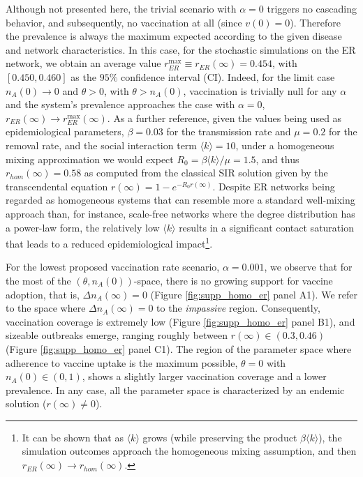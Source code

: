 \documentclass[
 reprint,
 amsmath,amssymb,
 aps,
]{revtex4-2}
\begin{document}
Although not presented here, the trivial scenario with $\alpha=0$ triggers no cascading behavior, and subsequently, no vaccination at all (since $v(0)=0$). Therefore the prevalence is always the maximum expected according to the given disease and network characteristics. In this case, for the stochastic simulations on the ER network, we obtain an average value $r_{ER}^{\mathrm{max}}\equiv r_{ER}(\infty)=0.454$, with $[0.450, 0.460]$ as the $95\%$ confidence interval (CI). Indeed, for the limit case $n_A(0)\to 0$ and $\theta>0$, with $\theta>n_A(0)$, vaccination is trivially null for any $\alpha$ and the system's prevalence approaches the case with $\alpha=0$, $r_{ER}(\infty)\to r_{ER}^{\mathrm{max}}(\infty)$. As a further reference, given the values being used as epidemiological parameters, $\beta=0.03$ for the transmission rate and $\mu=0.2$ for the removal rate, and the social interaction term $\langle k\rangle=10$, under a homogeneous mixing approximation we would expect $R_0=\beta\langle k\rangle/\mu=1.5$, and thus $r_{hom}(\infty)=0.58$ as computed from the classical SIR solution given by the transcendental equation $r(\infty)=1-e^{-R_0r(\infty)}$. Despite ER networks being regarded as homogeneous systems that can resemble more a standard well-mixing approach than, for instance, scale-free networks where the degree distribution has a power-law form, the relatively low $\langle k\rangle$ results in a significant contact saturation that leads to a reduced epidemiological impact\footnote{It can be shown that as $\langle k\rangle$ grows (while preserving the product $\beta\langle k\rangle$), the simulation outcomes approach the homogeneous mixing assumption, and then $r_{ER}(\infty)\to r_{hom}(\infty)$.}.

For the lowest proposed vaccination rate scenario, $\alpha=0.001$, we observe that for the most of the $(\theta, n_A(0))$-space, there is no growing support for vaccine adoption, that is, $\Delta n_A(\infty)=0$ (Figure \ref{fig:supp_homo_er} panel A1). We refer to the space where $\Delta n_A(\infty)=0$ to the \textit{impassive} region. Consequently, vaccination coverage is extremely low (Figure \ref{fig:supp_homo_er} panel B1), and sizeable outbreaks emerge, ranging roughly between $r(\infty)\in(0.3, 0.46)$ (Figure \ref{fig:supp_homo_er} panel C1). The region of the parameter space where adherence to vaccine uptake is the maximum possible, $\theta=0$ with $n_A(0)\in(0,1)$, shows a slightly larger vaccination coverage and a lower prevalence. In any case, all the parameter space is characterized by an endemic solution ($r(\infty)\neq 0$).
\end{document}
